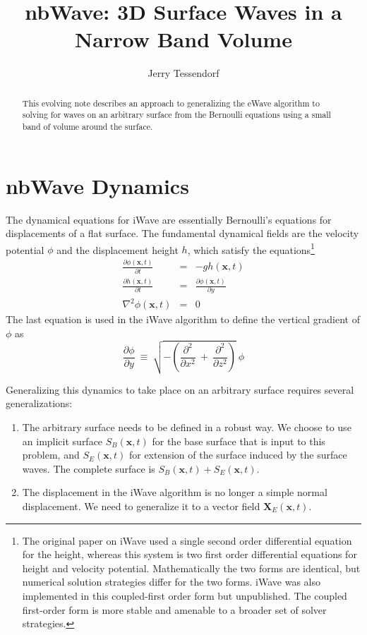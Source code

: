 \documentclass{article}
\title{nbWave:  3D Surface Waves in a Narrow Band Volume}
\author{Jerry Tessendorf}
\def\xvec{\textbf{x}}
\def\Xvec{\textbf{X}}
\begin{document}
\maketitle

\begin{abstract}
This evolving note describes an approach to generalizing the eWave algorithm to solving for waves on an arbitrary surface  from the Bernoulli equations using a small band of volume around the surface.
\end{abstract}

\section{nbWave Dynamics}

The dynamical equations for iWave are essentially Bernoulli's equations for displacements of a flat surface.  The fundamental dynamical fields are the velocity potential $\phi$ and the displacement height $h$, which satisfy the equations\footnote{The original paper on iWave used a single second order differential equation for the height, whereas this system is two first order differential equations for height and velocity potential.  Mathematically the two forms are identical, but numerical solution strategies differ for the two forms.  iWave was also implemented in this coupled-first order form but unpublished. The coupled first-order form is more stable and amenable to a broader set of solver strategies.}
\begin{eqnarray}
\frac{\partial \phi(\xvec,t)}{\partial t} &=& -g h(\xvec,t) \\
\frac{\partial h(\xvec,t)}{\partial t} &=& \frac{\partial \phi(\xvec,t)}{\partial y}  \\
\nabla^2 \phi(\xvec,t) &=& 0
\end{eqnarray}
The last equation is used in the iWave algorithm to define the vertical gradient of $\phi$ as
\begin{equation}
\frac{\partial \phi}{\partial y}\ \equiv\ \sqrt{-\left(\frac{\partial^2}{\partial x^2} \ +\ \frac{\partial^2}{\partial z^2}\right)} \ \phi \label{fractiongrad}
\end{equation}

Generalizing this dynamics to take place on an arbitrary surface requires several generalizations: 
\begin{enumerate}
\item The arbitrary surface needs to be defined in a robust way.  We choose to use an implicit surface $S_B(\xvec,t)$ for the base surface that is input to this problem, and $S_E(\xvec,t)$ for extension of the surface induced by the surface waves.  The complete surface is $S_B(\xvec,t) + S_E(\xvec,t)$.

\item The displacement in the iWave algorithm is no longer a simple normal displacement.  We need to generalize it to a vector field $\Xvec_E(\xvec,t)$.  
\end{enumerate}
\end{document}
